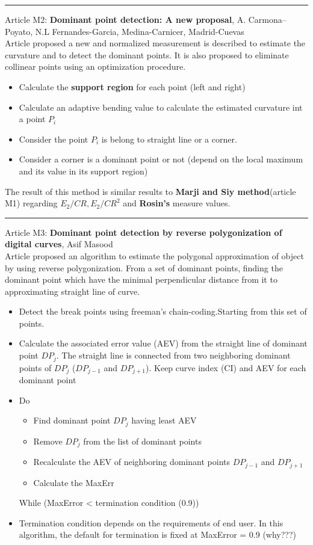 \documentclass[12pt, a4paper]{report}
\begin{document}
\noindent\rule{16cm}{0.4pt}
	Article M2: \textbf{Dominant point detection: A new proposal}, A. Carmona--Poyato, N.L Fernandes-Garcia, Medina-Carnicer, Madrid-Cuevas\\[0.2cm]
	Article proposed a new and normalized measurement is described to estimate the curvature and to detect the dominant points. It is also proposed to eliminate collinear points using an optimization procedure.
	\begin{itemize}
		\item Calculate the \textbf{support region} for each point (left and right)
		\item Calculate an adaptive bending value to calculate the estimated curvature int a point $P_{i}$
		\item Consider the point $P_{i}$ is belong to straight line or a corner.
		\item Consider a corner is a dominant point or not (depend on the local maximum and its value in its support region)
	\end{itemize}
	The result of this method is similar results to \textbf{Marji and Siy method}(article M1) regarding $E_{2}/CR, E_{2}/CR^{2}$ and \textbf{Rosin's} measure values.\\[0.3cm]
	\noindent\rule{16cm}{0.4pt}
	Article M3: \textbf{Dominant point detection by reverse polygonization of digital curves}, Asif Masood\\[0.2cm]
	Article proposed an algorithm to estimate the polygonal approximation of object by using reverse polygonization. From a set of dominant points, finding the dominant point which have the minimal perpendicular distance from it to approximating straight line of curve.
	\begin{itemize}
		\item Detect the break points using freeman's chain-coding.Starting from this set of points.
		\item Calculate the associated error value (AEV) from the straight line  of dominant point $DP_{j}$. The straight line is connected from two neighboring dominant points of $DP_{j}$ ($DP_{j-1}$ and $DP_{j+1}$). Keep curve index (CI) and AEV for each dominant point
		\item Do
			\begin{itemize}
				\item Find dominant point $DP_{j}$ having least AEV
				\item Remove $DP_{j}$ from the list of dominant points
				\item Recalculate the AEV of neighboring dominant points $DP_{j-1}$ and $DP_{j+1}$
				\item Calculate the MaxErr
			\end{itemize}
			While (MaxError < termination condition (0.9))
		\item Termination condition depends on the requirements of end user. In this algorithm, the default for termination is fixed at MaxError = 0.9 (why???)
	\end{itemize}
\end{document}
